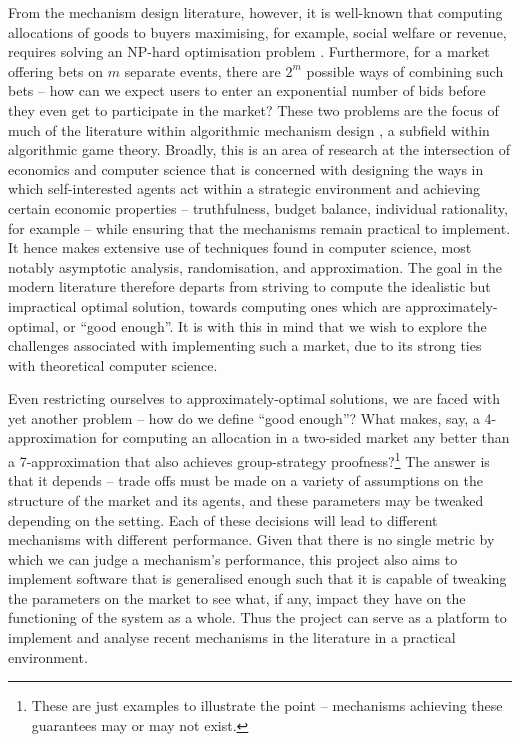 \documentclass[10pt,a4paper]{article}
\theoremstyle{plain}
\theoremstyle{definition}
\begin{document}
	From the mechanism design literature, however, it is well-known that
	computing allocations of goods to buyers maximising, for example, social
	welfare or revenue, requires solving an NP-hard optimisation problem
	\cite{VCGNPhard}. Furthermore, for a market offering bets on $m$ separate
	events, there are $2^m$ possible ways of combining such bets -- how can we
	expect users to enter an exponential number of bids before they even get to
	participate in the market? These two problems are the focus of much of the
	literature within algorithmic mechanism design \cite{Nisan2001}, a subfield
	within algorithmic game theory. Broadly, this is an area of research at
	the intersection of economics and computer science that is concerned with
	designing the ways in which self-interested agents act within a strategic
	environment and achieving certain economic properties -- truthfulness,
	budget balance, individual rationality, for example -- while ensuring that
	the mechanisms remain practical to implement. It hence makes extensive use
	of techniques found in computer science, most notably asymptotic
	analysis, randomisation, and approximation. The goal in the modern
	literature therefore departs from striving to compute the idealistic but
	impractical optimal solution, towards computing ones which are
	approximately-optimal, or ``good enough''. It is with this in mind that we
	wish to explore the challenges associated with implementing such a market,
	due to its strong ties with theoretical computer science.

	Even restricting ourselves to approximately-optimal solutions, we are faced
	with yet another problem -- how do we define ``good enough''? What makes,
	say, a 4-approximation for computing an allocation in a two-sided market
	any better than a 7-approximation that also achieves group-strategy
	proofness?\footnote{These are just examples to illustrate the point --
	mechanisms achieving these guarantees may or may not exist.} The answer is
	that it depends -- trade offs must be made on a variety of assumptions on
	the structure of the market and its agents, and these parameters may be
	tweaked depending on the setting. Each of these decisions will lead to
	different mechanisms with different performance. Given that there is no
	single metric by which we can judge a mechanism's performance, this project
	also aims to implement software that is generalised enough such that it is
	capable of tweaking the parameters on the market to see what, if any,
	impact they have on the functioning of the system as a whole. Thus the
	project can serve as a platform to implement and analyse recent mechanisms
	in the literature in a practical environment.
\end{document}
